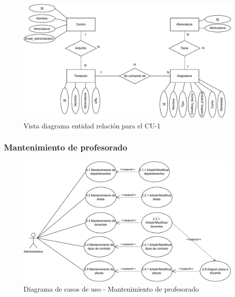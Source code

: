 \begin{figure}[!h]
	\centering
	\includegraphics[scale=0.75]{../img/Anexos/Casos uso/Vistas ER/Diagrama E-R CU 1.pdf}
	\caption{Vista diagrama entidad relación para el CU-1}
	\label{er_cu1}
\end{figure}
\FloatBarrier

\newpage
\subsubsection{Mantenimiento de profesorado}
\begin{figure}[!h]
	\centering
	\includegraphics[scale=0.75]{../img/Anexos/Casos uso/Diagrama casos de uso 3.pdf}
	\caption{Diagrama de casos de uso - Mantenimiento de profesorado}
\end{figure}
\FloatBarrier

